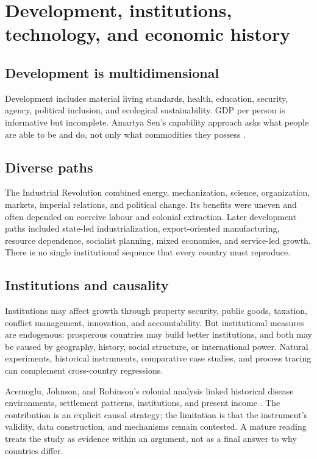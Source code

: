 \documentclass[11pt,oneside,openany]{book}
\begin{document}
\chapter{Development, institutions, technology, and economic history}
\label{ch:development}

\section{Development is multidimensional}

Development includes material living standards, health, education, security, agency, political inclusion, and ecological sustainability. GDP per person is informative but incomplete. Amartya Sen's capability approach asks what people are able to be and do, not only what commodities they possess \cite{sen1999}.

\section{Diverse paths}

The Industrial Revolution combined energy, mechanization, science, organization, markets, imperial relations, and political change. Its benefits were uneven and often depended on coercive labour and colonial extraction. Later development paths included state-led industrialization, export-oriented manufacturing, resource dependence, socialist planning, mixed economies, and service-led growth. There is no single institutional sequence that every country must reproduce.

\section{Institutions and causality}

Institutions may affect growth through property security, public goods, taxation, conflict management, innovation, and accountability. But institutional measures are endogenous: prosperous countries may build better institutions, and both may be caused by geography, history, social structure, or international power. Natural experiments, historical instruments, comparative case studies, and process tracing can complement cross-country regressions.

Acemoglu, Johnson, and Robinson's colonial analysis linked historical disease environments, settlement patterns, institutions, and present income \cite{acemoglu2001,albouy2012}. The contribution is an explicit causal strategy; the limitation is that the instrument's validity, data construction, and mechanisms remain contested. A mature reading treats the study as evidence within an argument, not as a final answer to why countries differ.
\end{document}
